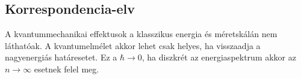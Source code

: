   \subsection{Korrespondencia-elv}
   
   A kvantummechanikai effektusok a klasszikus energia és méretskálán nem láthatóak. A kvantumelmélet akkor lehet csak helyes, ha visszaadja a nagyenergiás határesetet. Ez a $\hbar\to 0$, ha diszkrét az energiaspektrum akkor az $n\to \infty$ esetnek felel meg. 
   
   
